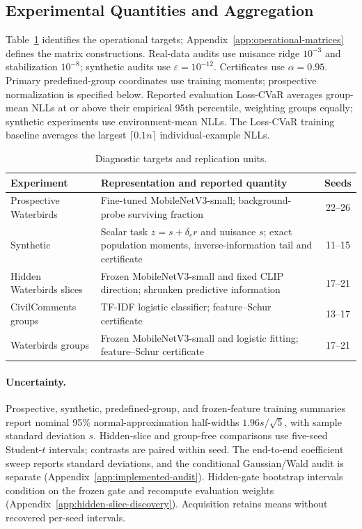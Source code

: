 \subsection{Experimental Quantities and Aggregation}
\label{app:experimental-conventions}

Table~\ref{tab:d-experiment-overview} identifies the operational targets; Appendix~\ref{app:operational-matrices} defines the matrix constructions. Real-data audits use nuisance ridge $10^{-3}$ and stabilization $10^{-8}$; synthetic audits use $\varepsilon=10^{-12}$. Certificates use $\alpha=0.95$. Primary predefined-group coordinates use training moments; prospective normalization is specified below. Reported evaluation Loss-CVaR averages group-mean NLLs at or above their empirical 95th percentile, weighting groups equally; synthetic experiments use environment-mean NLLs. The Loss-CVaR training baseline averages the largest $\lceil0.1n\rceil$ individual-example NLLs.

\begin{table}[htbp]
\centering\small
\setlength{\tabcolsep}{3pt}
\caption{Diagnostic targets and replication units.}
\label{tab:d-experiment-overview}
\begin{tabular}{@{}p{.26\linewidth}p{.61\linewidth}c@{}}
\toprule
Experiment & Representation and reported quantity & Seeds \\
\midrule
Prospective Waterbirds & Fine-tuned MobileNetV3-small; background-probe surviving fraction & 22--26 \\
Synthetic & Scalar task $z=s+\delta_e r$ and nuisance $s$; exact population moments, inverse-information tail and certificate & 11--15 \\
Hidden Waterbirds slices & Frozen MobileNetV3-small and fixed CLIP direction; shrunken predictive information & 17--21 \\
CivilComments groups & TF-IDF logistic classifier; feature--Schur certificate & 13--17 \\
Waterbirds groups & Frozen MobileNetV3-small and logistic fitting; feature--Schur certificate & 17--21 \\
\bottomrule
\end{tabular}
\par\smallskip
\end{table}


\paragraph{Uncertainty.}
Prospective, synthetic, predefined-group, and frozen-feature training summaries report nominal 95\% normal-approximation half-widths $1.96s/\sqrt5$, with sample standard deviation $s$. Hidden-slice and group-free comparisons use five-seed Student-$t$ intervals; contrasts are paired within seed. The end-to-end coefficient sweep reports standard deviations, and the conditional Gaussian/Wald audit is separate (Appendix~\ref{app:implemented-audit}). Hidden-gate bootstrap intervals condition on the frozen gate and recompute evaluation weights (Appendix~\ref{app:hidden-slice-discovery}). Acquisition retains means without recovered per-seed intervals.

